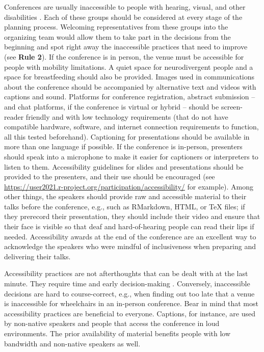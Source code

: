 \documentclass[10pt,letterpaper]{article}
\begin{document}
Conferences are usually inaccessible to people with hearing, visual, and other disabilities \cite{price_access_2009}. Each of these groups should be considered at every stage of the planning process. Welcoming representatives from these groups into the organizing team would allow them to take part in the decisions from the beginning and spot right away the inaccessible practices that need to improve (see \textbf{Rule 2}). If the conference is in person, the venue must be accessible for people with mobility limitations. A quiet space for neurodivergent people and a space for breastfeeding should also be provided. Images used in communications about the conference should be accompanied by alternative text and videos with captions and sound. Platforms for conference registration, abstract submission -- and chat platforms, if the conference is virtual or hybrid -- should be screen-reader friendly and with low technology requirements (that do not have compatible hardware, software, and internet connection requirements to function, all this tested beforehand). Captioning for presentations should be available in more than one language if possible. If the conference is in-person, presenters should speak into a microphone to make it easier for captioners or interpreters to listen to them. Accessibility guidelines for slides and presentations should be provided to the presenters, and their use should be encouraged (see \url{https://user2021.r-project.org/participation/accessibility/} for example). Among other things, the speakers should provide raw and accessible material to their talks before the conference, e.g., such as RMarkdown, HTML, or TeX files; if they prerecord their presentation, they should include their video and ensure that their face is visible so that deaf and hard-of-hearing people can read their lips if needed. Accessibility awards at the end of the conference are an excellent way to acknowledge the speakers who were mindful of inclusiveness when preparing and delivering their talks. 

Accessibility practices are not afterthoughts that can be dealt with at the last minute. They require time and early decision-making \cite{irish_increasing_2020}. Conversely, inaccessible decisions are hard to course-correct, e.g., when finding out too late that a venue is inaccessible for wheelchairs in an in-person conference. 
Bear in mind that most accessibility practices are beneficial to everyone. Captions, for instance, are used by non-native speakers and people that access the conference in loud environments. The prior availability of material benefits people with low bandwidth and non-native speakers as well.
\end{document}
